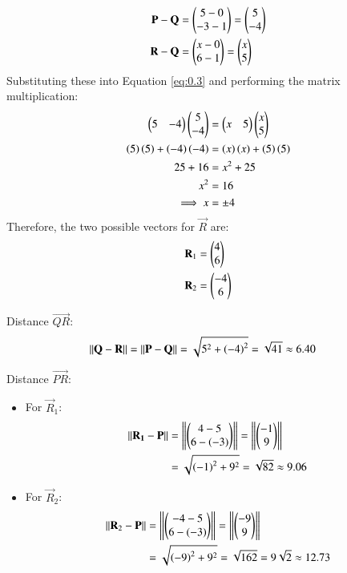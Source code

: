 \documentclass[journal]{IEEEtran}
\begin{document}
\begin{align}
    \mathbf{P} - \mathbf{Q} &= \begin{pmatrix}5 - 0 \\ -3 - 1\end{pmatrix} = \begin{pmatrix}5 \\ -4\end{pmatrix} \\
    \mathbf{R} - \mathbf{Q} &= \begin{pmatrix}x - 0 \\ 6 - 1\end{pmatrix} = \begin{pmatrix}x \\ 5\end{pmatrix}
\end{align}
Substituting these into Equation \eqref{eq:0.3} and performing the matrix multiplication:
\begin{align}
    \begin{pmatrix} 5 & -4\end{pmatrix} \begin{pmatrix}5 \\ -4\end{pmatrix} &= \begin{pmatrix} x & 5 \end{pmatrix} \begin{pmatrix}x \\ 5\end{pmatrix} \\
    \left(5\right)\left(5\right) + \left(-4\right)\left(-4\right) &= \left(x\right)\left(x\right) + \left(5\right)\left(5\right) \\
    25 + 16 &= x^2 + 25 \\
    x^2 &= 16 \\
    \implies x &= \pm 4
\end{align}
Therefore, the two possible vectors for $\vec{R}$ are:
\begin{align}
\mathbf{R}_1 &= \begin{pmatrix}4 \\ 6\end{pmatrix}  \\  \mathbf{R}_2 &= \begin{pmatrix}-4 \\ 6\end{pmatrix}
\end{align}


Distance $\vec{QR}$:
\begin{align}
     \left\lVert\mathbf{Q} - \mathbf{R}\right\rVert&= \left\lVert\mathbf{P} - \mathbf{Q}\right\rVert = \sqrt{5^2 + \left(-4\right)^2} = \sqrt{41} \approx 6.40
\end{align}

Distance $\vec{PR}$:
\begin{itemize}
    \item For $\vec{R}_1$:
    \begin{align}
     \left\lVert\mathbf{R_1} - \mathbf{P}\right\rVert &= \left\lVert \begin{pmatrix}4 - 5 \\ 6 - \left(-3\right)\end{pmatrix}\right\rVert  = \left\lVert \begin{pmatrix}-1 \\ 9\end{pmatrix}\right\rVert \\
    &= \sqrt{\left(-1\right)^2 + 9^2} = \sqrt{82} \approx 9.06
    \end{align}
    \item For $\vec{R}_2$:
    \begin{align}
    \left\lVert\mathbf{R}_2 - \mathbf{P}\right\rVert &= \left\lVert\begin{pmatrix}-4 - 5 \\ 6 - (-3)\end{pmatrix}\right\rVert  = \left\lVert\begin{pmatrix}-9 \\ 9\end{pmatrix}\right\rVert \\
    &= \sqrt{\left(-9\right)^2 + 9^2} = \sqrt{162} = 9\sqrt{2} \approx 12.73
    \end{align}
\end{itemize}
\end{document}
